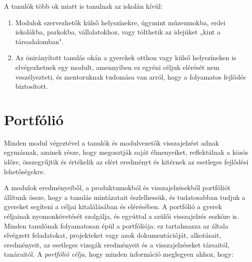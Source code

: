 A tanulók több ok miatt is tanulnak az iskolán kívül:
\begin{enumerate}
\item Modulok szervezhetők külső helyszínekre, úgymint múzeumokba, erdei iskolákba, parkokba, vállalatokhoz, vagy tölthetik az idejüket „kint a társadalomban".

\item Az önirányított tanulás okán a gyerekek otthon vagy külső helyszíneken is elvégezhetnek egy modult, amennyiben ez egyéni céljuk elérését nem veszélyezteti, és mentoruknak tudomása van arról, hogy a folyamatos fejlődés biztosított.
\end{enumerate}




\section{Portfólió}
Minden modul végeztével a tanulók és modulvezetők visszajelzést adnak egymásnak, aminek része, hogy megosztják saját élmenyeiket, reflektálnak a közös időre, összegyűjtik és értékelik az elért eredményt és kitérnek az esetleges fejlődési lehetőségekre.

A modulok eredményeiből, a produktumokból és visszajelzésekből portfóliót állítunk össze, hogy a tanulás mintázatait észlelhessük, és tudatosabban tudjuk a gyereket segíteni a céljai kitalálásában és elérésében. A portfólió a gyerek céljainak nyomonkövetését szolgálja, és egyúttal a szülői visszajelzés eszköze is. Minden tanulónak folyamatosan épül a portfóliója: ez tartalmazza az általa elvégzett feladatokat, projekteket vagy azok dokumentációját, alkotásait, eredményeit, az esetleges vizsgák eredményeit és a visszajelzéseket társaitól, tanáraitól. A \emph{portfólió célja}, hogy minden információ meglegyen ahhoz, hogy:

